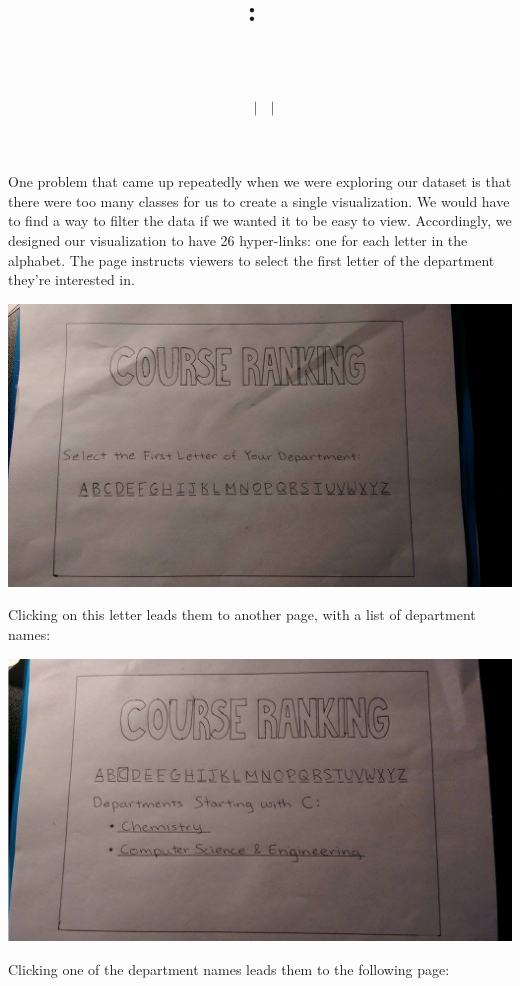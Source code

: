 \documentclass{article}
\title{
    \vspace{2in}
    \textmd{\textbf{\hmwkClass:\ \hmwkTitle}}\\
    \vspace{0.2in}\large{\textit{\hmwkClassInstructor\ \hmwkClassTime}}\\
    \author{\textbf{\hmwkAuthorName\ $\vert$ \hmwkAuthorCSE\ $\vert$ \hmwkAuthorId}}
}
\date{}
\begin{document}
One problem that came up repeatedly when we were exploring our dataset is that there were too many classes for us to create a single visualization. We would have to find a way to filter the data if we wanted it to be easy to view. Accordingly, we designed our visualization to have 26 hyper-links: one for each letter in the alphabet. The page instructs viewers to select the first letter of the department they're interested in.

\begin{center}
    \includegraphics[width=\textwidth]{1.png}
\end{center}

Clicking on this letter leads them to another page, with a list of department names:

\begin{center}
    \includegraphics[width=\textwidth]{2.png}
\end{center}

Clicking one of the department names leads them to the following page:
\end{document}
